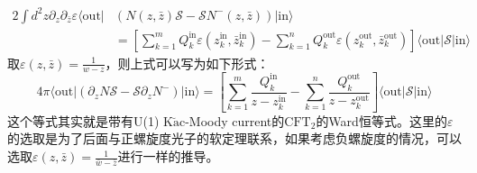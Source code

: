\begin{equation}
	\begin{aligned}
		2\int d^2z\partial_z\partial_{\bar{z}}\varepsilon\langle\text{out}|&\left(N(z,\bar{z})\mathcal{S}-\mathcal{S}N^-(z,\bar{z})\right)|\text{in}\rangle\\&=\left[\sum_{k=1}^mQ_k^\text{in}\varepsilon(z_k^\text{in},\bar{z}_k^\text{in})-\sum_{k=1}^nQ_k^\text{out}\varepsilon(z_k^\text{out},{\bar{z}}_k^\text{out})\right]\langle\text{out}|\mathcal{S}|\text{in}\rangle
	\end{aligned}
\end{equation}
取$\varepsilon(z,\bar z)=\frac{1}{w-z}$，则上式可以写为如下形式：
\begin{equation}\label{eq:24.5}
	4\pi\langle\mathrm{out}|\left(\partial_zN\mathcal{S}-\mathcal{S}\partial_zN^-\right)|\mathrm{in}\rangle=\left[\sum_{k=1}^m\frac{Q_k^\mathrm{in}}{z-z_k^\mathrm{in}}-\sum_{k=1}^n\frac{Q_k^\mathrm{out}}{z-z_k^\mathrm{out}}\right]\langle\mathrm{out}|\mathcal{S}|\mathrm{in}\rangle 
\end{equation}
这个等式其实就是带有U(1) K$\breve{\text{a}}$c-Moody current的$\text{CFT}_2$的Ward恒等式\cite{Blumenhagen:2009zz,He:2015zea,Strominger:2013lka,Nande:2017dba}。这里的$\varepsilon$的选取是为了后面与正螺旋度光子的软定理联系，如果考虑负螺旋度的情况，可以选取$\varepsilon(z,\bar z)=\frac{1}{\bar w-\bar z}$进行一样的推导。

